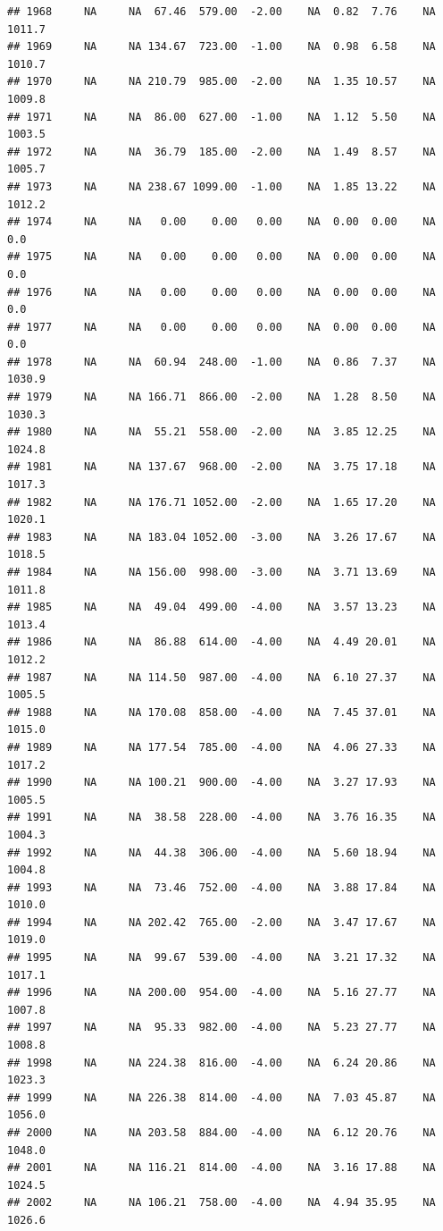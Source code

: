 \documentclass{article}\usepackage{graphicx, color}
\makeatletter
\newenvironment{kframe}{%
 \def\at@end@of@kframe{}%
 \ifinner\ifhmode%
  \def\at@end@of@kframe{\end{minipage}}%
  \begin{minipage}{\columnwidth}%
 \fi\fi%
 \def\FrameCommand##1{\hskip\@totalleftmargin \hskip-\fboxsep
 \colorbox{shadecolor}{##1}\hskip-\fboxsep
     \hskip-\linewidth \hskip-\@totalleftmargin \hskip\columnwidth}%
 \MakeFramed {\advance\hsize-\width
   \@totalleftmargin\z@ \linewidth\hsize
   \@setminipage}}%
 {\par\unskip\endMakeFramed%
 \at@end@of@kframe}
\newenvironment{knitrout}{}{} %
\makeatother
\begin{document}
\begin{knitrout}
\begin{kframe}
\begin{verbatim}
## 1968     NA     NA  67.46  579.00  -2.00    NA  0.82  7.76    NA 1011.7
## 1969     NA     NA 134.67  723.00  -1.00    NA  0.98  6.58    NA 1010.7
## 1970     NA     NA 210.79  985.00  -2.00    NA  1.35 10.57    NA 1009.8
## 1971     NA     NA  86.00  627.00  -1.00    NA  1.12  5.50    NA 1003.5
## 1972     NA     NA  36.79  185.00  -2.00    NA  1.49  8.57    NA 1005.7
## 1973     NA     NA 238.67 1099.00  -1.00    NA  1.85 13.22    NA 1012.2
## 1974     NA     NA   0.00    0.00   0.00    NA  0.00  0.00    NA    0.0
## 1975     NA     NA   0.00    0.00   0.00    NA  0.00  0.00    NA    0.0
## 1976     NA     NA   0.00    0.00   0.00    NA  0.00  0.00    NA    0.0
## 1977     NA     NA   0.00    0.00   0.00    NA  0.00  0.00    NA    0.0
## 1978     NA     NA  60.94  248.00  -1.00    NA  0.86  7.37    NA 1030.9
## 1979     NA     NA 166.71  866.00  -2.00    NA  1.28  8.50    NA 1030.3
## 1980     NA     NA  55.21  558.00  -2.00    NA  3.85 12.25    NA 1024.8
## 1981     NA     NA 137.67  968.00  -2.00    NA  3.75 17.18    NA 1017.3
## 1982     NA     NA 176.71 1052.00  -2.00    NA  1.65 17.20    NA 1020.1
## 1983     NA     NA 183.04 1052.00  -3.00    NA  3.26 17.67    NA 1018.5
## 1984     NA     NA 156.00  998.00  -3.00    NA  3.71 13.69    NA 1011.8
## 1985     NA     NA  49.04  499.00  -4.00    NA  3.57 13.23    NA 1013.4
## 1986     NA     NA  86.88  614.00  -4.00    NA  4.49 20.01    NA 1012.2
## 1987     NA     NA 114.50  987.00  -4.00    NA  6.10 27.37    NA 1005.5
## 1988     NA     NA 170.08  858.00  -4.00    NA  7.45 37.01    NA 1015.0
## 1989     NA     NA 177.54  785.00  -4.00    NA  4.06 27.33    NA 1017.2
## 1990     NA     NA 100.21  900.00  -4.00    NA  3.27 17.93    NA 1005.5
## 1991     NA     NA  38.58  228.00  -4.00    NA  3.76 16.35    NA 1004.3
## 1992     NA     NA  44.38  306.00  -4.00    NA  5.60 18.94    NA 1004.8
## 1993     NA     NA  73.46  752.00  -4.00    NA  3.88 17.84    NA 1010.0
## 1994     NA     NA 202.42  765.00  -2.00    NA  3.47 17.67    NA 1019.0
## 1995     NA     NA  99.67  539.00  -4.00    NA  3.21 17.32    NA 1017.1
## 1996     NA     NA 200.00  954.00  -4.00    NA  5.16 27.77    NA 1007.8
## 1997     NA     NA  95.33  982.00  -4.00    NA  5.23 27.77    NA 1008.8
## 1998     NA     NA 224.38  816.00  -4.00    NA  6.24 20.86    NA 1023.3
## 1999     NA     NA 226.38  814.00  -4.00    NA  7.03 45.87    NA 1056.0
## 2000     NA     NA 203.58  884.00  -4.00    NA  6.12 20.76    NA 1048.0
## 2001     NA     NA 116.21  814.00  -4.00    NA  3.16 17.88    NA 1024.5
## 2002     NA     NA 106.21  758.00  -4.00    NA  4.94 35.95    NA 1026.6

\end{verbatim}
\end{kframe}
\end{knitrout}
\end{document}
